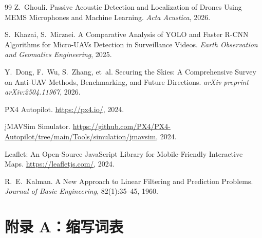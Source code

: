 \documentclass[12pt, a4paper]{ctexart}
\begin{document}
\begin{thebibliography}{99}
Z.~Ghouli.
Passive Acoustic Detection and Localization of Drones Using MEMS Microphones and Machine Learning.
\emph{Acta Acustica}, 2026.

S.~Khazai, S.~Mirzaei.
A Comparative Analysis of YOLO and Faster R-CNN Algorithms for Micro-UAVs Detection in Surveillance Videos.
\emph{Earth Observation and Geomatics Engineering}, 2025.

Y.~Dong, F.~Wu, S.~Zhang, et~al.
Securing the Skies: A Comprehensive Survey on Anti-UAV Methods, Benchmarking, and Future Directions.
\emph{arXiv preprint arXiv:2504.11967}, 2026.

PX4 Autopilot.
\url{https://px4.io/}, 2024.

jMAVSim Simulator.
\url{https://github.com/PX4/PX4-Autopilot/tree/main/Tools/simulation/jmavsim}, 2024.

Leaflet: An Open-Source JavaScript Library for Mobile-Friendly Interactive Maps.
\url{https://leafletjs.com/}, 2024.

R.~E.~Kalman.
A New Approach to Linear Filtering and Prediction Problems.
\emph{Journal of Basic Engineering}, 82(1):35--45, 1960.

\end{thebibliography}


\appendix
\section*{附录 A：缩写词表}
\label{sec:glossary}
\end{document}
